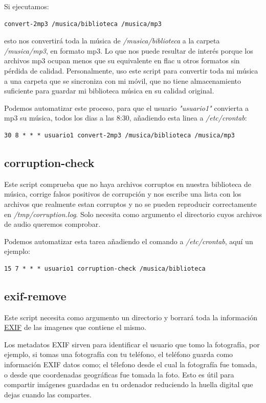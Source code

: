 \documentclass[12pt]{article}
\begin{document}
Si ejecutamos:
\begin{verbatim}
convert-2mp3 /musica/biblioteca /musica/mp3
\end{verbatim}

esto nos convertirá toda la música de \emph{/musica/biblioteca} a la carpeta \emph{/musica/mp3}, en formato mp3. Lo que nos puede resultar de interés porque los archivos mp3 ocupan menos que su equivalente en flac u otros formatos sin pérdida de calidad. Personalmente, uso este script para convertir toda mi música a una carpeta que se sincroniza con mi móvil, que no tiene almacenamiento suficiente para guardar mi biblioteca música en su calidad original.

Podemos automatizar este proceso, para que el usuario \emph{"usuario1"} convierta a mp3 su música, todos los dias a las 8:30, añadiendo esta linea a \emph{/etc/crontab}:

\begin{verbatim}
30 8 * * * usuario1 convert-2mp3 /musica/biblioteca /musica/mp3
\end{verbatim}

\subsection{corruption-check}

Este script comprueba que no haya archivos corruptos en nuestra biblioteca de música, corrige falsos positivos de corrupción y nos escribe una lista con los archivos que realmente estan corruptos y no se pueden reproducir correctamente en \emph{/tmp/corruption.log}. Solo necesita como argumento el directorio cuyos archivos de audio queremos comprobar.

Podemos automatizar esta tarea añadiendo el comando a \emph{/etc/crontab}, aquí un ejemplo:

\begin{verbatim}
15 7 * * * usuario1 corruption-check /musica/biblioteca
\end{verbatim}

\subsection{exif-remove}

Este script necesita como argumento un directorio y borrará toda la información \href{https://en.wikipedia.org/wiki/Exif}{EXIF} de las imagenes que contiene el mismo.

Los metadatos EXIF sirven para identificar el usuario que tomo la fotografía, por ejemplo, si tomas una fotografía con tu teléfono, el teléfono guarda como información EXIF datos como; el télefono desde el cual la fotografía fue tomada, o desde que coordenadas geográficas fue tomada la foto. Esto es útil para compartir imágenes guardadas en tu ordenador reduciendo la huella digital que dejas cuando las compartes.
\end{document}
